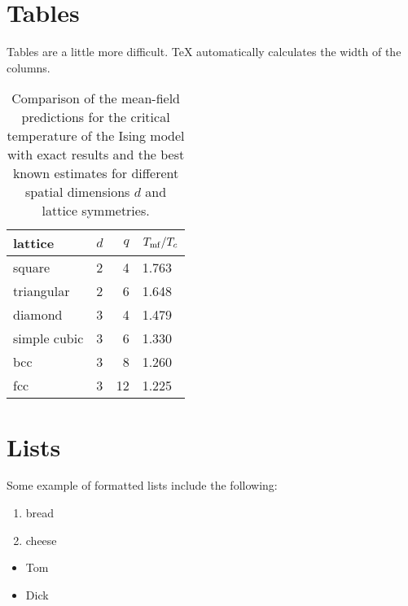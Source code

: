 \documentclass[12pt]{article}
\begin{document}
 \section{Tables}
 Tables are a little more difficult. TeX
 automatically calculates the width of the columns.

 \begin{table}[h]
  \begin{center}
   \begin{tabular}{|l|l|r|l|}
    \hline
    lattice & $d$ & $q$ & $T_{\rm mf}/T_c$ \\
    \hline
    square & 2 & 4 & 1.763 \\
    \hline
    triangular & 2 & 6 & 1.648 \\
    \hline
    diamond & 3 & 4 & 1.479 \\
    \hline
    simple cubic & 3 & 6 & 1.330 \\
    \hline
    bcc & 3 & 8 & 1.260 \\
    \hline
    fcc & 3 & 12 & 1.225 \\
    \hline
   \end{tabular}
   \caption{\label{tab:5/tc}Comparison of the mean-field predictions
   for the critical temperature of the Ising model with exact results
   and the best known estimates for different spatial dimensions $d$
    and lattice symmetries.}
  \end{center}
 \end{table}

 \section{Lists}

 Some example of formatted lists include the
 following:

 \begin{enumerate}

  \item bread

  \item cheese

 \end{enumerate}

 \begin{itemize}

  \item Tom

  \item Dick

 \end{itemize}
\end{document}
